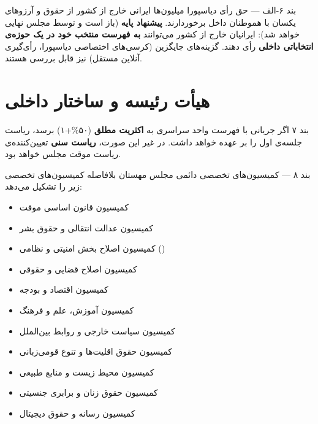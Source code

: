 \begin{bandbox}{بند ۶-الف --- حق رأی دیاسپورا}
	میلیون‌ها ایرانی خارج از کشور از حقوق و آرزوهای یکسان با هموطنان داخل برخوردارند.
	\textbf{پیشنهاد پایه} (باز است و توسط مجلس نهایی خواهد شد): ایرانیان خارج از کشور
	می‌توانند \textbf{به فهرست منتخب خود در یک حوزه‌ی انتخاباتی داخلی} رأی دهند.
	گزینه‌های جایگزین (کرسی‌های اختصاصی دیاسپورا، رأی‌گیری آنلاین مستقل) نیز قابل بررسی هستند.
\end{bandbox}

\section{هیأت رئیسه و ساختار داخلی}

\begin{bandbox}{بند ۷}
	اگر جریانی با فهرست واحد سراسری به \textbf{اکثریت مطلق} (۵۰\%+۱) برسد، ریاست
	جلسه‌ی اول را بر عهده خواهد داشت. در غیر این صورت، \textbf{ریاست سنی}
	تعیین‌کننده‌ی ریاست موقت مجلس خواهد بود.
\end{bandbox}

\begin{bandbox}{بند ۸ --- کمیسیون‌های تخصصی دائمی}
	مجلس مهستان بلافاصله کمیسیون‌های تخصصی زیر را تشکیل می‌دهد:
	\begin{itemize}
		\item کمیسیون قانون اساسی موقت
		\item کمیسیون عدالت انتقالی و حقوق بشر
		\item کمیسیون اصلاح بخش امنیتی و نظامی ()
		\item کمیسیون اصلاح قضایی و حقوقی
		\item کمیسیون اقتصاد و بودجه
		\item کمیسیون آموزش، علم و فرهنگ
		\item کمیسیون سیاست خارجی و روابط بین‌الملل
		\item کمیسیون حقوق اقلیت‌ها و تنوع قومی‌زبانی
		\item کمیسیون محیط زیست و منابع طبیعی
		\item کمیسیون حقوق زنان و برابری جنسیتی
		\item کمیسیون رسانه و حقوق دیجیتال
	\end{itemize}
\end{bandbox}

